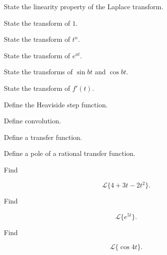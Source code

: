 \begin{exercise}[1]
State the linearity property of the Laplace transform.
\end{exercise}

\begin{exercise}[1]
State the transform of \(1\).
\end{exercise}

\begin{exercise}[1]
State the transform of \(t^n\).
\end{exercise}

\begin{exercise}[1]
State the transform of \(e^{at}\).
\end{exercise}

\begin{exercise}[1]
State the transforms of \(\sin bt\) and \(\cos bt\).
\end{exercise}

\begin{exercise}[1]
State the transform of \(f'(t)\).
\end{exercise}

\begin{exercise}[1]
Define the Heaviside step function.
\end{exercise}

\begin{exercise}[1]
Define convolution.
\end{exercise}

\begin{exercise}[1]
Define a transfer function.
\end{exercise}

\begin{exercise}[1]
Define a pole of a rational transfer function.
\end{exercise}

\begin{exercise}[2]
Find

\[
\mathcal{L}\{4+3t-2t^2\}.
\]
\end{exercise}

\begin{exercise}[2]
Find

\[
\mathcal{L}\{e^{5t}\}.
\]
\end{exercise}

\begin{exercise}[2]
Find

\[
\mathcal{L}\{\cos4t\}.
\]
\end{exercise}

